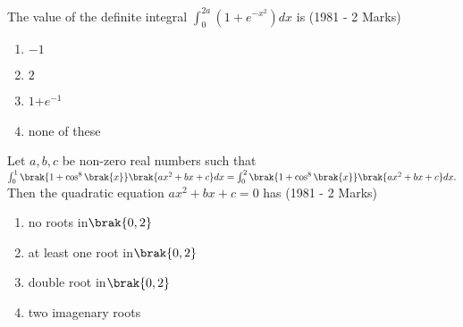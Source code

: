\iffalse	
\title{Assignment}
\author{Bheri Sai Likith Reddy}
\section{mcq-single}
\fi
	\item The value of the definite integral $\int_0^{2a}(1+e^{-x^2})dx$ is
		\hfill{(1981 - 2 Marks)}
		\begin{enumerate}
                	\item $-1$            
	                \item  $2$
	                \item  $1$+$e^{-1}$    
			\item  none of these
		\end{enumerate}
	\item Let $a,b,c$ be non-zero real numbers such that $\int_0^1 \brak{1+ \cos ^8 \brak{x}} \brak{ax^2 + bx +c} dx = \int_0^2 \brak{ 1+ \cos^8\brak{x} } \brak{ax^2+bx+c} dx.$\\
		Then the quadratic equation $ax^2+bx+c=0$ has
			\hfill{(1981 - 2 Marks)}
			\begin{enumerate}
			\item no roots in$ \brak{0,2}$
			\item at least one root in$ \brak{0,2}$
			\item double root in$ \brak{0,2}  $
			\item two imagenary roots
                        \end{enumerate}
	

